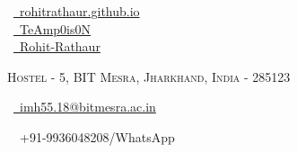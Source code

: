 \documentclass[a4paper,10pt]{extarticle} %
\begin{document}
\pagestyle{empty} %


\begin{multicols}{3}
\normalsize  \faGlobe\ {\href{https://teamp0is0n.github.io/rohit-rathaur.github.io/}{\ rohitrathaur.github.io}}\\
\normalsize \faGithub\ {\href{https://github.com/TeAmp0is0N}{\  TeAmp0is0N}}\\
\normalsize  \faLinkedinSquare\ {\href{https://www.linkedin.com/in/rohit-singh-rathaur/}{\  Rohit-Rathaur}}\\
\columnbreak
\normalsize\par{\centering{\huge\textsc{\textcolor{primary}{Rohit Singh Rathaur}}}\par} %
\par{\centering\normalsize {\textsc{Hostel - 5, BIT Mesra, Jharkhand, India - 285123}}\hfill\par}
\columnbreak
\raggedright\hfill\normalsize \faEnvelope\ {\href{mailto:imh55.18@bitmesra.ac.in}{\  imh55.18@bitmesra.ac.in}}\\
\raggedright\hfill{\faPhone\ \  +91-9936048208/WhatsApp}
\end{multicols}
\vspace{-0.4 cm}

\end{document}
